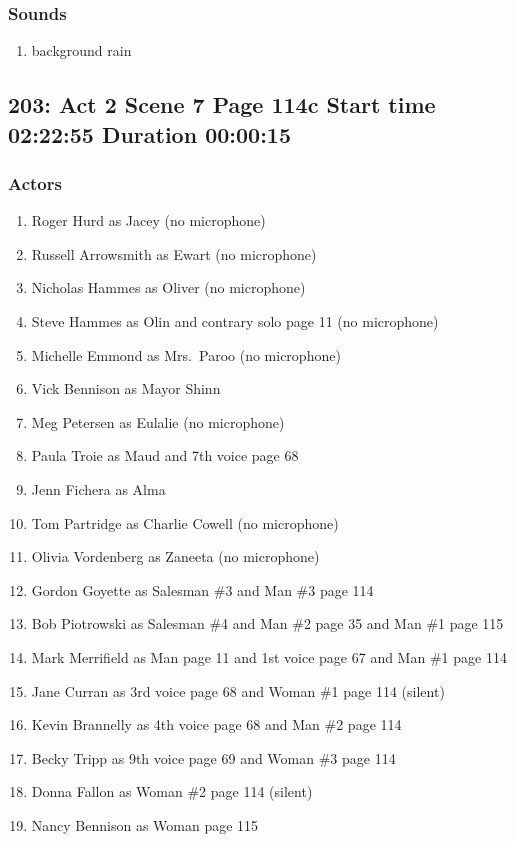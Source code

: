 \subsubsection{Sounds}
\begin{enumerate}
\item background rain
\end{enumerate}
\subsection{203: Act 2 Scene 7 Page 114c Start time 02:22:55 Duration 00:00:15}

\subsubsection{Actors}
\begin{enumerate}
\item Roger Hurd as Jacey (no microphone)
\item Russell Arrowsmith as Ewart (no microphone)
\item Nicholas Hammes as Oliver (no microphone)
\item Steve Hammes as Olin and contrary solo page 11 (no microphone)
\item Michelle Emmond as Mrs.~Paroo (no microphone)
\item Vick Bennison as Mayor Shinn
\item Meg Petersen as Eulalie (no microphone)
\item Paula Troie as Maud and 7th voice page 68
\item Jenn Fichera as Alma
\item Tom Partridge as Charlie Cowell (no microphone)
\item Olivia Vordenberg as Zaneeta (no microphone)
\item Gordon Goyette as Salesman \#3 and Man \#3 page 114
\item Bob Piotrowski as Salesman \#4 and Man \#2 page 35 and Man \#1 page 115
\item Mark Merrifield as Man page 11 and 1st voice page 67 and Man \#1 page 114
\item Jane Curran as 3rd voice page 68 and Woman \#1 page 114 (silent)
\item Kevin Brannelly as 4th voice page 68 and Man \#2 page 114
\item Becky Tripp as 9th voice page 69 and Woman \#3 page 114
\item Donna Fallon as Woman \#2 page 114 (silent)
\item Nancy Bennison as Woman page 115
\end{enumerate}


